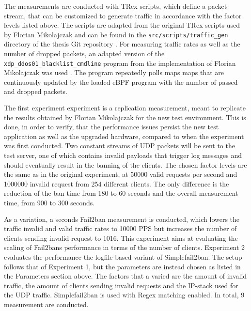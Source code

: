 The measurements are conducted with TRex scripts, which define a packet stream, that can be customized to generate traffic
in accordance with the factor levels listed above. The scripts are adapted from the original TRex scripts used by Florian Mikolajczak \cite{mikolajczak2022} 
and can be found in the \texttt{src/scripts/traffic\_gen} directory of the thesis Git repository \cite{gitlab}. 
For measuring traffic rates as well as the number of dropped packets, an adapted version of the \texttt{xdp\_ddos01\_blacklist\_cmdline} program
from the implementation of Florian Mikolajczak was used \cite{mikolajczak2022}. The program repeatedly polls maps
maps that are continuously updated by the loaded \ac{eBPF} program with the number of passed and dropped packets.  
\par
{}
The first experiment experiment is a replication measurement, meant to replicate the results obtained by Florian Mikolajczak \cite{mikolajczak2022}
for the new test environment. This is done, in order to verify, that the performance issues persist the new test application
as well as the upgraded hardware, compared to when the experiment was first conducted. Two constant streams of UDP packets will be sent to
the test server, one of which contains invalid payloads that trigger log messages and should eventually result in the banning of the clients. The chosen factor levels are the same as in the 
original experiment, at 50000 valid requests per second and 1000000 invalid request from 254 different clients. The only difference is the reduction of the 
ban time from 180 to 60 seconds and the overall measurement time, from 900 to 300 seconds.
\par
As a variation, a seconds Fail2ban measurement is conducted, which lowers the traffic invalid and valid traffic rates to 10000 \ac{PPS}
but increases the number of clients sending invalid request to 1016. This experiment aims at evaluating the scaling of Fail2bans performance in terms
of the number of clients.
Experiment 2 evaluates the performance the logfile-based variant of Simplefail2ban. The setup follows that of Experiment 1, but the parameters 
are instead chosen as listed in the Parameters section above. The factors that a varied are the amount of invalid traffic, the amount of clients 
sending invalid requests and the \ac{IP}-stack used for the \ac{UDP} traffic. Simplefail2ban is used with \ac{Regex} matching enabled. In total, 9 measurement are conducted.    
